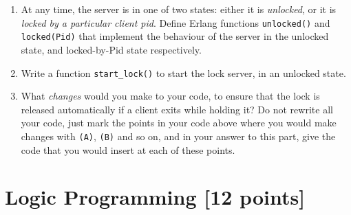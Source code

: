 \documentclass{article}
\begin{document}
\begin{enumerate}
\begin{enumerate}
\item
At any time, the server is in one of two states: either it is {\em
  unlocked}, or it is {\em locked by a particular client pid}. 
Define Erlang functions \verb!unlocked()! and \verb!locked(Pid)! that
implement the behaviour of the server in the unlocked state, and
locked-by-Pid state respectively.

\item
Write a function \verb!start_lock()! to start the lock server, in an
unlocked state.

\item
What {\em changes} would you make to your code, to ensure that the
lock is released automatically if a client exits while holding it? Do
not rewrite all your code, just mark the points in your code above
where you would make changes with \verb!(A)!, \verb!(B)! and so on,
and in your answer to this part, give the code that you would insert
at each of these points.  

\end{enumerate}

\end{enumerate}

\newpage
\section{Logic Programming [12 points]}
\end{document}
